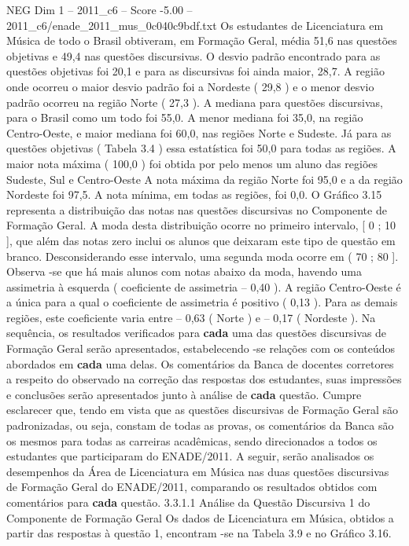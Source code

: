 \begin{textsample}{NEG Dim 1 – 2011\_c6 – Score -5.00 – 2011\_c6/enade\_2011\_mus\_0c040c9bdf.txt}
Os estudantes de Licenciatura em Música de todo o Brasil obtiveram, em Formação Geral, média 51,6 nas questões objetivas e 49,4 nas questões discursivas.
O desvio padrão encontrado para as questões objetivas foi 20,1 e para as discursivas foi ainda maior, 28,7.
A região onde ocorreu o maior desvio padrão foi a Nordeste ( 29,8 ) e o menor desvio padrão ocorreu na região Norte ( 27,3 ).
A mediana para questões discursivas, para o Brasil como um todo foi 55,0.
A menor mediana foi 35,0, na região Centro-Oeste, e maior mediana foi 60,0, nas regiões Norte e Sudeste.
Já para as questões objetivas ( Tabela 3.4 ) essa estatística foi 50,0 para todas as regiões.
A maior nota máxima ( 100,0 ) foi obtida por pelo menos um aluno das regiões Sudeste, Sul e Centro-Oeste A nota máxima da região Norte foi 95,0 e a da região Nordeste foi 97,5.
A nota mínima, em todas as regiões, foi 0,0.
O Gráfico 3.15 representa a distribuição das notas nas questões discursivas no Componente de Formação Geral.
A moda desta distribuição ocorre no primeiro intervalo, [ 0 ; 10 ], que além das notas zero inclui os alunos que deixaram este tipo de questão em branco.
Desconsiderando esse intervalo, uma segunda moda ocorre em ( 70 ; 80 ].
Observa -se que há mais alunos com notas abaixo da moda, havendo uma assimetria à esquerda ( coeficiente de assimetria – 0,40 ).
A região Centro-Oeste é a única para a qual o coeficiente de assimetria é positivo ( 0,13 ).
Para as demais regiões, este coeficiente varia entre – 0,63 ( Norte ) e – 0,17 ( Nordeste ).
Na sequência, os resultados verificados para \textbf{cada} uma das questões discursivas de Formação Geral serão apresentados, estabelecendo -se relações com os conteúdos abordados em \textbf{cada} uma delas.
Os comentários da Banca de docentes corretores a respeito do observado na correção das respostas dos estudantes, suas impressões e conclusões serão apresentados junto à análise de \textbf{cada} questão.
Cumpre esclarecer que, tendo em vista que as questões discursivas de Formação Geral são padronizadas, ou seja, constam de todas as provas, os comentários da Banca são os mesmos para todas as carreiras acadêmicas, sendo direcionados a todos os estudantes que participaram do ENADE/2011.
A seguir, serão analisados os desempenhos da Área de Licenciatura em Música nas duas questões discursivas de Formação Geral do ENADE/2011, comparando os resultados obtidos com comentários para \textbf{cada} questão. 3.3.1.1 Análise da Questão Discursiva 1 do Componente de Formação Geral Os dados de Licenciatura em Música, obtidos a partir das respostas à questão 1, encontram -se na Tabela 3.9 e no Gráfico 3.16.

\end{textsample}
